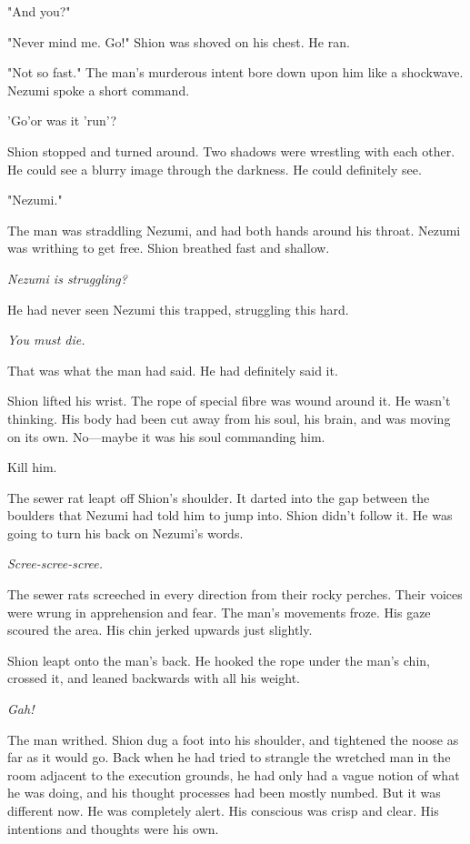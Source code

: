 "And you?"

"Never mind me. Go!" Shion was shoved on his chest. He ran.

"Not so fast." The man's murderous intent bore down upon him like a
shockwave. Nezumi spoke a short command.

'Go'\el or was it 'run'?

Shion stopped and turned around. Two shadows were wrestling with each
other. He could see a blurry image through the darkness. He could
definitely see.

"Nezumi."

The man was straddling Nezumi, and had both hands around his throat.
Nezumi was writhing to get free. Shion breathed fast and shallow.

\emph{Nezumi is struggling?}

He had never seen Nezumi this trapped, struggling this hard.

\emph{You must die.}

That was what the man had said. He had definitely said it.

Shion lifted his wrist. The rope of special fibre was wound around it.
He wasn't thinking. His body had been cut away from his soul, his brain,
and was moving on its own. No---maybe it was his soul commanding him.

Kill him.

The sewer rat leapt off Shion's shoulder. It darted into the gap between
the boulders that Nezumi had told him to jump into. Shion didn't follow
it. He was going to turn his back on Nezumi's words.

\emph{Scree-scree-scree.}

The sewer rats screeched in every direction from their rocky perches.
Their voices were wrung in apprehension and fear. The man's movements
froze. His gaze scoured the area. His chin jerked upwards just slightly.

Shion leapt onto the man's back. He hooked the rope under the man's
chin, crossed it, and leaned backwards with all his weight.

\emph{Gah!}

The man writhed. Shion dug a foot into his shoulder, and tightened the
noose as far as it would go. Back when he had tried to strangle the
wretched man in the room adjacent to the execution grounds, he had only
had a vague notion of what he was doing, and his thought processes had
been mostly numbed. But it was different now. He was completely alert.
His conscious was crisp and clear. His intentions and thoughts were his
own.

